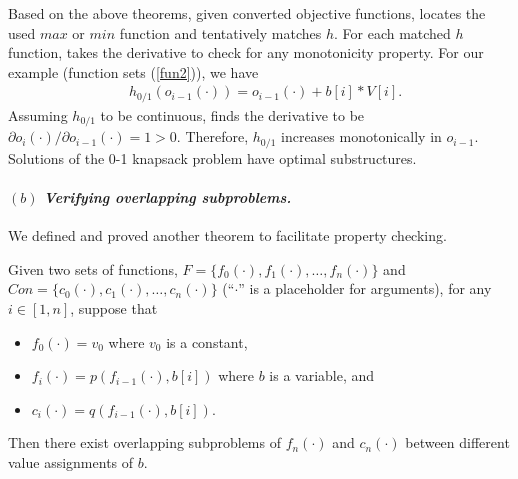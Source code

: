 
Based on the above theorems, given converted objective functions, \tool locates the used $max$ or $min$ function and tentatively matches $h$. 
For each matched $h$ function, \tool takes the derivative to check for any monotonicity property.
For our example (function sets (\ref{fun2})), we have 
\begin{align}
    & h_{0/1}(o_{i-1}(\cdot))=o_{i-1}(\cdot)+b[i]*V[i]. \nonumber
\end{align}
Assuming $h_{0/1}$ to be continuous, \tool finds the derivative to be $\partial o_i(\cdot)/\partial o_{i-1}(\cdot)=1>0$. Therefore, $h_{0/1}$ increases monotonically in $o_{i-1}$. Solutions of the 0-1 knapsack problem have   optimal substructures.  


\paragraph{$(b)$ \emph{Verifying overlapping subproblems.}} We defined and proved another theorem to facilitate property checking. 

\begin{theorem}
\label{thm2}
Given two sets of functions, $F=\{f_0(\cdot), f_1(\cdot), \ldots, f_n(\cdot)\}$ and $Con=\{c_0(\cdot), c_1(\cdot), \ldots, c_n(\cdot)\}$ (``$\cdot$'' is a placeholder for arguments), for 
any $i\in[1, n]$, suppose that 
\begin{itemize}
\item $f_0(\cdot)=v_0$ where $v_0$ is a constant, 
\item $f_i(\cdot)=p(f_{i-1}(\cdot), b[i])$ where $b$ is a variable, and
\item $c_i(\cdot)=q(f_{i-1}(\cdot), b[i])$. 
\end{itemize}
Then there exist overlapping subproblems of $f_n(\cdot)$ and $c_n(\cdot)$ 
between different value assignments of $b$.
\end{theorem}

